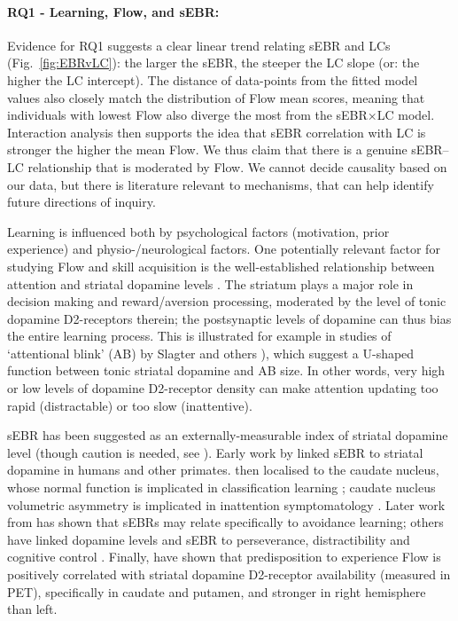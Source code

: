 \documentclass[10pt,letterpaper,floatsintext]{article}
\begin{document}
\paragraph{RQ1 - Learning, Flow, and sEBR:}
Evidence for RQ1 suggests a clear linear trend relating sEBR and LCs (Fig.~\ref{fig:EBRvLC}): the larger the sEBR, the steeper the LC slope (or: the higher the LC intercept). The distance of data-points from the fitted model values also closely match the distribution of Flow mean scores, meaning that individuals with lowest Flow also diverge the most from the sEBR$\times$LC model. Interaction analysis then supports the idea that sEBR correlation with LC is stronger the higher the mean Flow. We thus claim that there is a genuine sEBR--LC relationship that is moderated by Flow. We cannot decide causality based on our data, but there is literature relevant to mechanisms, that can help identify future directions of inquiry.

Learning is influenced both by psychological factors (motivation, prior experience) and physio-/neurological factors. One potentially relevant factor for studying Flow and skill acquisition is the well-established relationship between attention and striatal dopamine levels \cite{Dreisbach2005}. The striatum plays a major role in decision making and reward/aversion processing, moderated by the level of tonic dopamine D2-receptors therein; the postsynaptic levels of dopamine can thus bias the entire learning process. This is illustrated for example in studies of `attentional blink' (AB) by Slagter and others \cite{Slagter2012,COLZATO2008}), which suggest a U-shaped function between tonic striatal dopamine and AB size. In other words, very high or low levels of dopamine D2-receptor density can make attention updating too rapid (distractable) or too slow (inattentive).

sEBR has been suggested as an externally-measurable index of striatal dopamine level (though caution is needed, see \cite{dang2017spontaneous}). Early work by \cite{Karson1983} linked sEBR to striatal dopamine in humans and other primates. \cite{Taylor1999} then localised to the caudate nucleus, whose normal function is implicated in classification learning \cite{Seger2005}; caudate nucleus volumetric asymmetry is implicated in inattention symptomatology \cite{Schrimsher2002}. Later work from \cite{Slagter2015} has shown that sEBRs may relate specifically to avoidance learning; others have linked dopamine levels and sEBR to perseverance, distractibility and cognitive control \cite{Muller2007,Dreisbach2005}. Finally, \cite{DeManzano2013} have shown that  predisposition to experience Flow is positively correlated with striatal dopamine D2-receptor availability (measured in PET), specifically in caudate and putamen, and stronger in right hemisphere than left.
\end{document}
